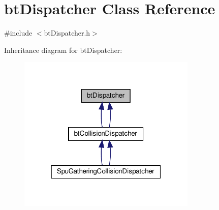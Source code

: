 \hypertarget{classbtDispatcher}{}\section{bt\+Dispatcher Class Reference}
\label{classbtDispatcher}


{\ttfamily \#include $<$bt\+Dispatcher.\+h$>$}



Inheritance diagram for bt\+Dispatcher\+:
\nopagebreak
\begin{figure}[H]
\begin{center}
\leavevmode
\includegraphics[width=241pt]{classbtDispatcher__inherit__graph}
\end{center}
\end{figure}
